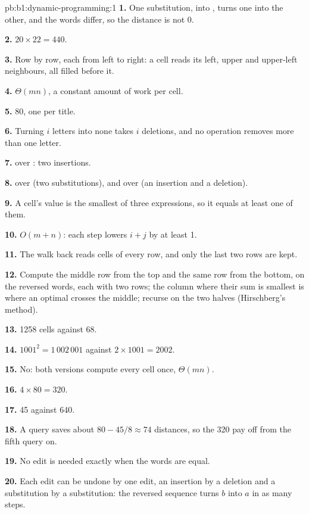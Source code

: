 \begin{solution}{pb:b1:dynamic-programming:1}
\textbf{1.} One substitution,  into , turns one into the other, and the words differ, so the distance is
not 0.

\textbf{2.} $20 \times 22 = 440$.

\textbf{3.} Row by row, each from left to right: a cell reads its left, upper and upper-left neighbours, all filled
before it.

\textbf{4.} $\Theta(mn)$, a constant amount of work per cell.

\textbf{5.} 80, one per title.

\textbf{6.} Turning $i$ letters into none takes $i$ deletions, and no operation removes more than one letter.

\textbf{7.}  over : two insertions.

\textbf{8.}  over  (two substitutions), and  over  (an
insertion and a deletion).

\textbf{9.} A cell's value is the smallest of three expressions, so it equals at least one of them.

\textbf{10.} $O(m + n)$: each step lowers $i + j$ by at least 1.

\textbf{11.} The walk back reads cells of every row, and only the last two rows are kept.

\textbf{12.} Compute the middle row from the top and the same row from the bottom, on the reversed words, each with two
rows; the column where their sum is smallest is where an optimal  crosses the middle; recurse on the two
halves (Hirschberg's method).

\textbf{13.} 1258 cells against 68.

\textbf{14.} $1001^2 = 1\,002\,001$ against $2 \times 1001 = 2002$.

\textbf{15.} No: both versions compute every cell once, $\Theta(mn)$.

\textbf{16.} $4 \times 80 = 320$.

\textbf{17.} 45 against 640.

\textbf{18.} A query saves about $80 - 45/8 \approx 74$ distances, so the 320 pay off from the fifth query on.

\textbf{19.} No edit is needed exactly when the words are equal.

\textbf{20.} Each edit can be undone by one edit, an insertion by a deletion and a substitution by a substitution: the
reversed sequence turns $b$ into $a$ in as many steps.


\end{solution}
